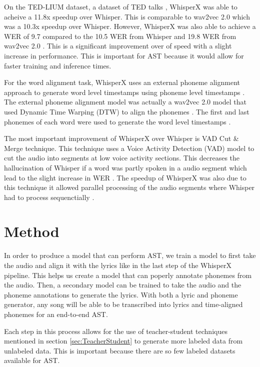 \documentclass[letterpaper, 12pt]{article}
\begin{document}
\begin{multicols*}{2}
On the TED-LIUM dataset, a dataset of TED talks \cite{tedlium3}, WhisperX was able to acheive a
11.8x speedup over Whisper. This is comparable to wav2vec 2.0 which was a 10.3x speedup over
Whisper. However, WhisperX was also able to achieve a WER of 9.7 compared to the 10.5 WER from
Whisper and 19.8 WER from wav2vec 2.0 \citep{whisperX}. This is a significant improvement over
of speed with a slight increase in performance. This is important for AST because it would allow
for faster training and inference times.

For the word alignment task, WhisperX uses an external phoneme alignment approach to generate
word level timestamps using phoneme level timestamps \citep{whisperX}. The external phoneme
alignment model was actually a wav2vec 2.0 model that used Dynamic Time Warping (DTW) \cite{DTW}
to align the phonemes \citep{whisperX}. The first and last phonemes of each word were used to
generate the word level timestamps \citep{whisperX}.

The most important improvement of WhisperX over Whisper is VAD Cut \& Merge technique. This
technique uses a Voice Activity Detection (VAD) model to cut the audio into segments at low voice
activity sections. This decreases the hallucination of Whisper if a word was partly spoken in a
audio segment which lead to the slight increase in WER \citep{whisperX}. The speedup of WhisperX
was also due to this technique it allowed parallel processing of the audio segments where
Whisper had to process sequenctially \citep{whisperX}.


\section{Method}
In order to produce a model that can perform AST, we train a model to first take the audio and align
it with the lyrics like in the last step of the WhisperX pipeline. This helps us create a model that
can poperly annotate phonemes from the audio. Then, a secondary model can be trained to take the
audio and the phoneme annotations to generate the lyrics. With both a lyric and phoneme generator,
any song will be able to be transcribed into lyrics and time-aligned phonemes for an end-to-end AST.

Each step in this process allows for the use of teacher-student techniques mentioned in section
\ref{sec:TeacherStudent} to generate more labeled data from unlabeled data. This is important
because there are so few labeled datasets available for AST.


\end{multicols*}
\end{document}
